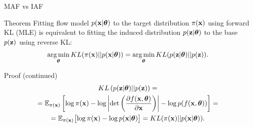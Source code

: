 \begin{frame}{MAF vs IAF}
	\begin{block}{Theorem}
		Fitting flow model $p(\mathbf{x}| \boldsymbol{\theta})$ to the target distribution $\pi(\mathbf{x})$ using forward KL (MLE) is equivalent to fitting the induced distribution $p(\mathbf{z}| \boldsymbol{\theta})$ to the base $p(\mathbf{z})$ using reverse KL:
		\[
			\operatorname*{arg\,min}_{\boldsymbol{\theta}} KL(\pi(\mathbf{x}) || p(\mathbf{x} | \boldsymbol{\theta})) = \operatorname*{arg\,min}_{\boldsymbol{\theta}} KL(p(\mathbf{z} | \boldsymbol{\theta}) || p(\mathbf{z})).
		\]
		\vspace{-0.5cm}
	\end{block}
	\begin{block}{Proof (continued)}
		\vspace{-0.5cm}
		\begin{multline*}
			KL\left(p(\mathbf{z} | \boldsymbol{\theta}) || p(\mathbf{z}) \right) = \\
			=  \mathbb{E}_{\pi(\mathbf{x})} \left[ \log \pi(\mathbf{x}) - \log \left| \det \left( \frac{\partial f(\mathbf{x}, \boldsymbol{\theta})}{\partial \mathbf{x}}\right) \right| - \log p(f(\mathbf{x}, \boldsymbol{\theta})) \right] = \\
			= \mathbb{E}_{\pi(\mathbf{x})} \bigl[ \log \pi(\mathbf{x}) - \log p(\mathbf{x} | \boldsymbol{\theta}) \bigr] = KL (\pi(\mathbf{x}) || p(\mathbf{x} | \boldsymbol{\theta})).
		\end{multline*}
	\end{block}
\end{frame}
